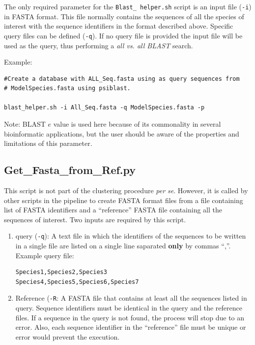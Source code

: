 \documentclass[10pt]{article}
\begin{document}
The only required parameter for the \texttt{Blast\_ helper.sh} script is an input file (\texttt{-i}) in  FASTA format. This file normally contains the sequences of all the species of interest with the sequence identifiers in the format described above. Specific query files can be defined (\texttt{-q}). If no query file is provided the input file will be used as the query, thus performing a \emph{all vs. all BLAST} search.

Example:
\begin{verbatim}
#Create a database with ALL_Seq.fasta using as query sequences from
# ModelSpecies.fasta using psiblast.

blast_helper.sh -i All_Seq.fasta -q ModelSpecies.fasta -p
\end{verbatim}



Note: BLAST $e$ value is used here because of its commonality in
several bioinformatic applications, but the user should be aware of the properties  and limitations of this parameter.


\subsection{Get\_Fasta\_from\_Ref.py}\label{sec:getfastafromref} This
script is not part of the clustering procedure \emph{per se}. However, it is
called by other scripts in the pipeline to create FASTA format files
from a file containing list of FASTA identifiers and a ``reference''
FASTA file containing all the sequences of interest. Two inputs are
required by this script.
\begin{enumerate}
\item query (\texttt{-q}): A text file in which the identifiers of
the sequences to be written in a single file are listed on a single
line saparated \textbf{only} by commas ``,''.  Example query file:
\begin{verbatim} 
Species1,Species2,Species3
Species4,Species5,Species6,Species7
\end{verbatim}
\item Reference (\texttt{-R}: A FASTA file that contains at least all
the sequences listed in query. Sequence identifiers must be identical
in the query and the reference files. If a sequence in the query is not
found, the process will stop due to an error. Also, each sequence
identifier in the ``reference'' file must be unique or error would
prevent the execution.
\end{enumerate}
\end{document}
